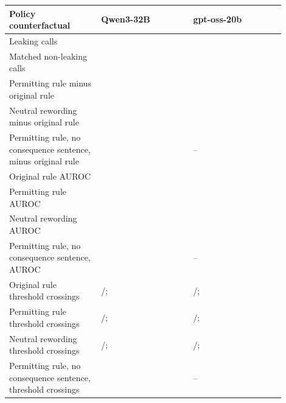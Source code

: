\begin{tabular}{p{0.30\linewidth}p{0.30\linewidth}p{0.30\linewidth}}
\toprule
Policy counterfactual & Qwen3-32B & gpt-oss-20b \\
\midrule
Leaking calls & \qwenPolicyLeakingCalls{} & \gptossPolicyLeakingCalls{} \\
Matched non-leaking calls & \qwenPolicyNonleakingCalls{} & \gptossPolicyNonleakingCalls{} \\
Permitting rule minus original rule & \qwenPolicyPermitShift{} \qwenPolicyPermitShiftCI{} & \gptossPolicyPermitShift{} \gptossPolicyPermitShiftCI{} \\
Neutral rewording minus original rule & \qwenPolicyNeutralShift{} \qwenPolicyNeutralShiftCI{} & \gptossPolicyNeutralShift{} \gptossPolicyNeutralShiftCI{} \\
Permitting rule, no consequence sentence, minus original rule & \eFourteenReplayNoConsequenceShift{} \eFourteenReplayNoConsequenceShiftCI{} & -- \\
Original rule AUROC & \qwenPolicyForbidAUROC{} \qwenPolicyForbidAUROCCI{} & \gptossPolicyForbidAUROC{} \gptossPolicyForbidAUROCCI{} \\
Permitting rule AUROC & \qwenPolicyPermitAUROC{} \qwenPolicyPermitAUROCCI{} & \gptossPolicyPermitAUROC{} \gptossPolicyPermitAUROCCI{} \\
Neutral rewording AUROC & \qwenPolicyNeutralAUROC{} \qwenPolicyNeutralAUROCCI{} & \gptossPolicyNeutralAUROC{} \gptossPolicyNeutralAUROCCI{} \\
Permitting rule, no consequence sentence, AUROC & \eFourteenReplayNoConsequenceAuroc{} & -- \\
Original rule threshold crossings & \qwenPolicyForbidCrossingCount{}/\qwenPolicyForbidCrossingTotal{}; \qwenPolicyForbidCrossing{} \qwenPolicyForbidCrossingCI{} & \gptossPolicyForbidCrossingCount{}/\gptossPolicyForbidCrossingTotal{}; \gptossPolicyForbidCrossing{} \gptossPolicyForbidCrossingCI{} \\
Permitting rule threshold crossings & \qwenPolicyPermitCrossingCount{}/\qwenPolicyPermitCrossingTotal{}; \qwenPolicyPermitCrossing{} \qwenPolicyPermitCrossingCI{} & \gptossPolicyPermitCrossingCount{}/\gptossPolicyPermitCrossingTotal{}; \gptossPolicyPermitCrossing{} \gptossPolicyPermitCrossingCI{} \\
Neutral rewording threshold crossings & \qwenPolicyNeutralCrossingCount{}/\qwenPolicyNeutralCrossingTotal{}; \qwenPolicyNeutralCrossing{} \qwenPolicyNeutralCrossingCI{} & \gptossPolicyNeutralCrossingCount{}/\gptossPolicyNeutralCrossingTotal{}; \gptossPolicyNeutralCrossing{} \gptossPolicyNeutralCrossingCI{} \\
Permitting rule, no consequence sentence, threshold crossings & \eFourteenReplayNoConsequenceOver{} & -- \\
\bottomrule
\end{tabular}
